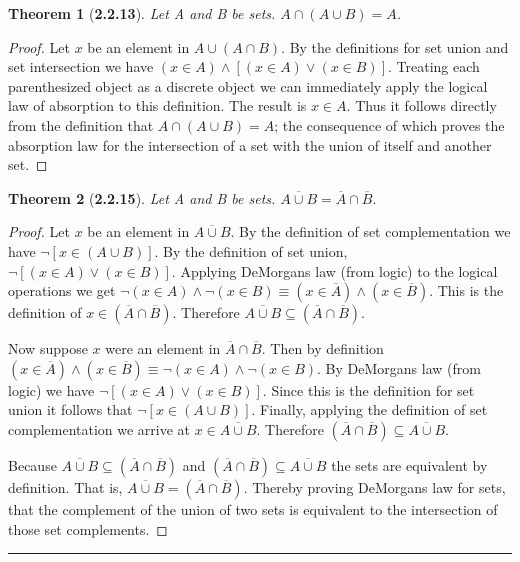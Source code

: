 \documentclass[a4paper, 12pt]{article}
\theoremstyle{plain}
\newtheorem*{theorem*}{Theorem}
\begin{document}
\begin{theorem*}[\textbf{2.2.13}]
    Let A and B be sets. $A \cap (A \cup B) = A$.
\end{theorem*}

\begin{proof}
    Let $x$ be an element in $A \cup (A \cap B)$. By the definitions for set union and set intersection 
    we have $(x \in A) \land [(x \in A) \lor (x \in B)]$. Treating each parenthesized object as a 
    discrete object we can immediately apply the logical law of absorption to this definition. The 
    result is $x \in A$. Thus it follows directly from the definition that $A \cap (A \cup B) = A$; the 
    consequence of which proves the absorption law for the intersection of a set with the union of 
    itself and another set.
\end{proof}

\pagebreak


\begin{theorem*}[\textbf{2.2.15}]
    Let A and B be sets. $\overline{A \cup B} = \overline{A} \cap \overline{B}.$
\end{theorem*}

\begin{proof}
    Let $x$ be an element in $\overline{A \cup B}$. By the definition of set \newline complementation we 
    have $\lnot [x \in (A \cup B)]$. By the definition of set union, \newline 
    $\lnot [(x \in A) \lor (x \in B)]$. Applying DeMorgans law (from logic) to the logical operations we 
    get $\lnot(x \in A) \land \lnot(x \in B) \equiv (x \in \overline{A}) \land (x \in \overline{B})$. 
    This is the definition of $x \in (\overline{A} \cap \overline{B})$. Therefore 
    $\overline{A \cup B} \subseteq (\overline{A} \cap \overline{B})$. 
    
    Now suppose $x$ were an element in $\overline{A} \cap \overline{B}$. Then by definition \newline 
    $(x \in \overline{A}) \land (x \in \overline{B}) \equiv \lnot (x \in A) \land \lnot (x \in B)$. 
    By DeMorgans law (from logic) we have $\lnot [(x \in A) \lor (x \in B)]$. Since this is the 
    definition for set union it follows that $\lnot [x \in (A \cup B)]$. Finally, applying the definition 
    of set complementation we arrive at $x \in \overline{A \cup B}$. Therefore 
    $(\overline{A} \cap \overline{B}) \subseteq \overline{A \cup B}$.
    
    Because $\overline{A \cup B} \subseteq (\overline{A} \cap \overline{B})$ and 
    $(\overline{A} \cap \overline{B}) \subseteq \overline{A \cup B}$ the sets are equivalent by definition. 
    That is,  $\overline{A \cup B} = (\overline{A} \cap \overline{B})$. Thereby proving DeMorgans law for sets, 
    that the complement of the union of two sets is equivalent to the intersection of those set complements.		
\end{proof}
\begin{center}
    \rule{5.4in}{1pt}
\end{center}
\end{document}
